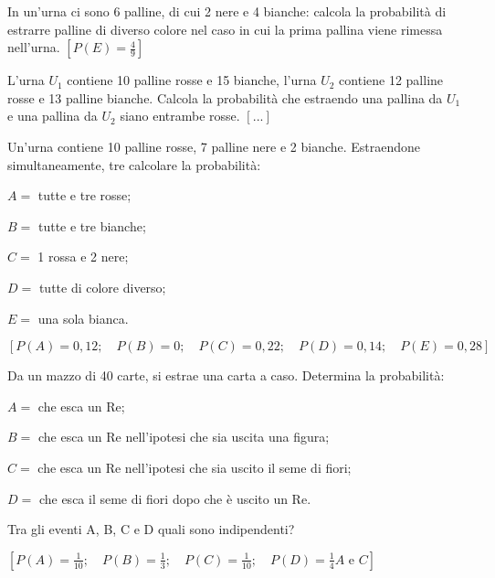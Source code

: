 \begin{esercizio}[\Ast]
 \label{ese:9.58}
In un'urna ci sono 6 palline, di cui 2 nere e 4 bianche: calcola la probabilità 
di estrarre palline di diverso colore nel caso in cui la prima pallina viene 
rimessa nell'urna.
\hfill \(\left[P(E)=\frac 4 9\right]\)
\end{esercizio}

\begin{esercizio}
 \label{ese:9.59}
L'urna \( U_1 \) contiene 10 palline rosse e 15 bianche, l'urna \( U_2 \) contiene 
12 palline rosse e 13 palline bianche. Calcola la probabilità che estraendo una 
pallina da \( U_1 \) e una pallina da \( U_2 \) siano entrambe rosse.
\hfill \(\left[...\right]\)
\end{esercizio}

\begin{esercizio}[\Ast]
 \label{ese:9.60}
 Un'urna contiene 10 palline rosse, 7 palline nere e 2 bianche. Estraendone 
simultaneamente, tre calcolare la probabilità:
\begin{itemize*}
 \item \( A= \) tutte e tre rosse;
 \item \( B= \) tutte e tre bianche;
 \item \( C= \) 1 rossa e 2 nere;
 \item \( D= \) tutte di colore diverso;
 \item \( E= \) una sola bianca.
\end{itemize*}
\hfill \(\left[P(A)=0,12; \quad P(B)=0; \quad P(C)=0,22; \quad P(D)=0,14; \quad 
P(E)=0,28\right]\)
\end{esercizio}

\begin{esercizio}[\Ast]
 \label{ese:9.61}
 Da un mazzo di 40 carte, si estrae una carta a caso. Determina la probabilità:
\begin{itemize*}
\item \( A= \) che esca un Re;
\item \( B= \) che esca un Re nell'ipotesi che sia uscita una figura;
\item \( C= \) che esca un Re nell'ipotesi che sia uscito il seme di fiori;
\item \( D= \) che esca il seme di fiori dopo che è uscito un Re.
\end{itemize*}
Tra gli eventi A, B, C e D quali sono indipendenti?

\hfill \(\left[P(A)=\frac 1{10} ; \quad  P(B)=\frac 1 3 ; \quad  P(C)=\frac 
1{10} ; \quad  P(D)=\frac 1 4 A \text{ e } C\right]\)
\end{esercizio}

